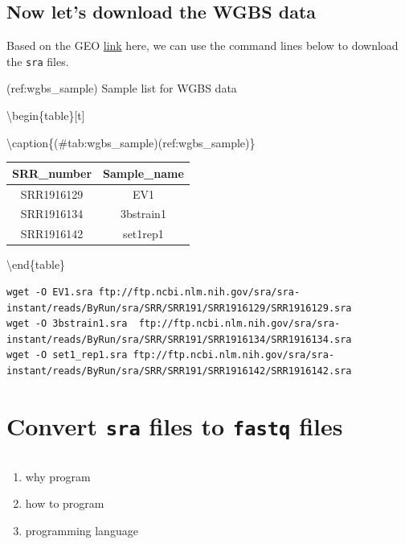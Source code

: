 \documentclass[]{book}
\begin{document}
\hypertarget{now-lets-download-the-wgbs-data}{%
\subsection{Now let's download the WGBS data}\label{now-lets-download-the-wgbs-data}}

Based on the GEO \href{https://www.ncbi.nlm.nih.gov//geo/query/acc.cgi?acc=GSE66905}{link} here, we can use the command lines below to download the \texttt{sra} files.

(ref:wgbs\_sample) Sample list for WGBS data

\textbackslash{}begin\{table\}{[}t{]}

\textbackslash{}caption\{(\#tab:wgbs\_sample)(ref:wgbs\_sample)\}
\centering

\begin{tabular}{c|c}
\hline
SRR\_number & Sample\_name\\
\hline
SRR1916129 & EV1\\
\hline
SRR1916134 & 3bstrain1\\
\hline
SRR1916142 & set1rep1\\
\hline
\end{tabular}

\textbackslash{}end\{table\}

\begin{verbatim}
wget -O EV1.sra ftp://ftp.ncbi.nlm.nih.gov/sra/sra-instant/reads/ByRun/sra/SRR/SRR191/SRR1916129/SRR1916129.sra
wget -O 3bstrain1.sra  ftp://ftp.ncbi.nlm.nih.gov/sra/sra-instant/reads/ByRun/sra/SRR/SRR191/SRR1916134/SRR1916134.sra
wget -O set1_rep1.sra ftp://ftp.ncbi.nlm.nih.gov/sra/sra-instant/reads/ByRun/sra/SRR/SRR191/SRR1916142/SRR1916142.sra
\end{verbatim}

\hypertarget{convert-sra-files-to-fastq-files}{%
\section{\texorpdfstring{Convert \texttt{sra} files to \texttt{fastq} files}{Convert sra files to fastq files}}\label{convert-sra-files-to-fastq-files}}

\begin{verbatim}
\end{verbatim}

\begin{enumerate}
\def\labelenumi{\arabic{enumi}.}
\item
  why program
\item
  how to program
\item
  programming language
\end{enumerate}
\end{document}
